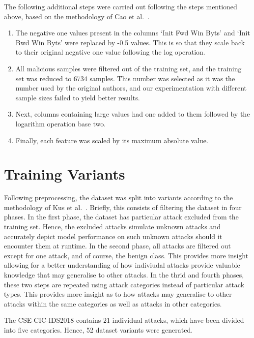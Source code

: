The following additional steps were carried out following the steps mentioned
above, based on the methodology of Cao et al.~\cite{Cao}.
\begin{enumerate}
      \item The negative one values present in the columns `Init Fwd Win Byts' and `Init
            Bwd Win Byts' were replaced by -0.5 values. This is so that they scale back to
            their original negative one value following the log operation.
      \item All malicious samples were filtered out of the training set, and the training
            set was reduced to 6734 samples. This number was selected as it was the number
            used by the original authors, and our experimentation with different sample
            sizes failed to yield better results.
      \item Next, columns containing large values had one added to them followed by the
            logarithm operation base two.
      \item Finally, each feature was scaled by its maximum absolute value.
\end{enumerate}

\section{Training Variants}%
\label{sec:variants}

Following preprocessing, the dataset was split into variants according to the
methodology of Kus et al.~\cite{Kus}. Briefly, this consists of filtering the
dataset in four phases. In the first phase, the dataset has particular attack
excluded from the training set. Hence, the excluded attacks simulate unknown
attacks and accurately depict model performance on such unknown attacks should
it encounter them at runtime. In the second phase, all attacks are filtered out
except for one attack, and of course, the benign class. This provides more
insight allowing for a better understanding of how indiviudal attacks provide
valuable knowledge that may generalise to other attacks. In the thrid and
fourth phases, these two steps are repeated using attack categories instead of
particular attack types. This provides more insight as to how attacks may
generalise to other attacks within the same categories as well as attacks in
other categories.

The CSE-CIC-IDS2018 contains 21 individual attacks, which have been divided
into five categories. Hence, 52 dataset variants were generated.

